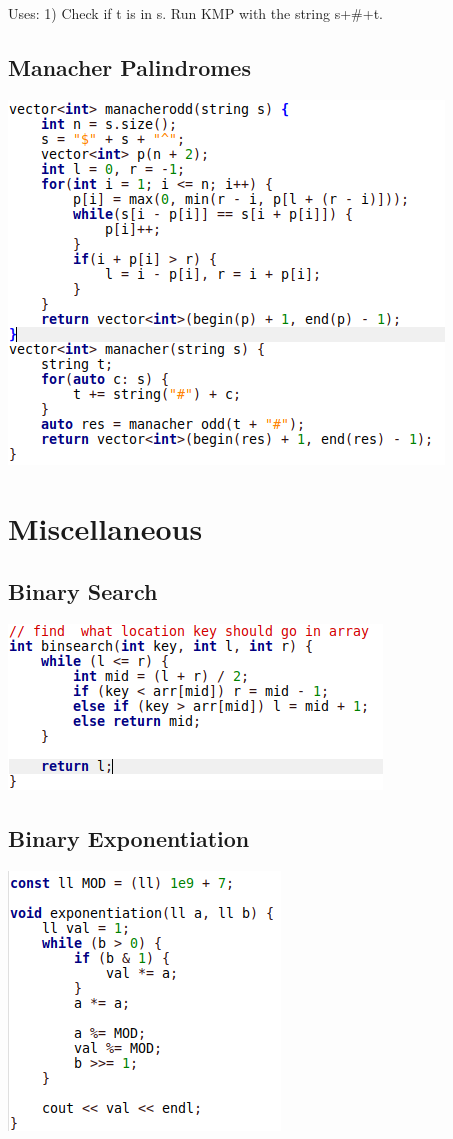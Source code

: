 \documentclass[11pt,twocolumn]{article}
\begin{document}
Uses:
1) Check if t is in s. Run KMP with the string s+\#+t.

\subsection{Manacher Palindromes}
\includegraphics[scale=0.5]{manacher}


\section{Miscellaneous}
\subsection{Binary Search}

\includegraphics[scale=0.5]{binsearch}

\subsection{Binary Exponentiation}

\includegraphics[scale=0.5]{binexp}
\end{document}
